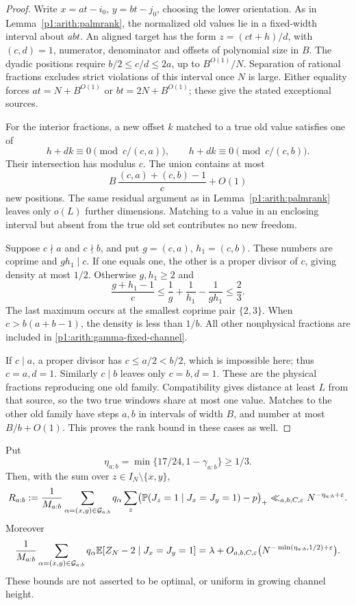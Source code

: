 \begin{proof}
Write \(x=at-i_0\), \(y=bt-j_0\), choosing the lower orientation.
As in Lemma~\ref{p1:arith:palmrank}, the normalized old values lie in
a fixed-width interval about \(abt\).  An aligned target has the form
\(z=(ct+h)/d\), with \((c,d)=1\), numerator, denominator and offsets
of polynomial size in \(B\).
The dyadic positions require
\(b/2\leq c/d\leq2a\), up to \(B^{O(1)}/N\).
Separation of rational fractions excludes strict violations of this
interval once \(N\) is large.
Either equality forces \(at=N+B^{O(1)}\) or \(bt=2N+B^{O(1)}\);
these give the stated exceptional sources.

For the interior fractions, a new offset \(k\) matched to a true old
value satisfies one of
\[
 h+dk\equiv0\pmod{c/(c,a)},\qquad
 h+dk\equiv0\pmod{c/(c,b)}.
\]
Their intersection has modulus \(c\).
The union contains at most
\[
 B\,\frac{(c,a)+(c,b)-1}{c}+O(1)
\]
new positions.  The same residual argument as in
Lemma~\ref{p1:arith:palmrank} leaves only \(o(L)\) further dimensions.
Matching to a value in an enclosing interval but absent from the true
old set contributes no new freedom.

Suppose \(c\nmid a\) and \(c\nmid b\), and put \(g=(c,a)\), \(h_1=(c,b)\).
These numbers are coprime and \(gh_1\mid c\).
If one equals one, the other is a proper divisor of \(c\), giving
density at most \(1/2\).
Otherwise \(g,h_1\geq2\) and
\[
 \frac{g+h_1-1}{c}
 \leq\frac1g+\frac1{h_1}-\frac1{gh_1}\leq\frac23.
\]
The last maximum occurs at the smallest coprime pair \(\{2,3\}\).
When \(c>b(a+b-1)\), the density is less than \(1/b\).
All other nonphysical fractions are included in
\eqref{p1:arith:gamma-fixed-channel}.

If \(c\mid a\), a proper divisor has \(c\leq a/2<b/2\), which is
impossible here; thus \(c=a,d=1\).
Similarly \(c\mid b\) leaves only \(c=b,d=1\).
These are the physical fractions reproducing one old family.
Compatibility gives distance at least \(L\) from that source, so the
two true windows share at most one value.
Matches to the other old family have steps \(a,b\) in intervals of
width \(B\), and number at most \(B/b+O(1)\).
This proves the rank bound in these cases as well.
\end{proof}

\begin{proposition}
\label{p1:arith:fixed-channel-palm}
Put
\[
 \eta_{a:b}=\min\{17/24,1-\gamma_{a:b}\}\geq1/3.
\]
Then, with the sum over \(z\in I_N\setminus\{x,y\}\),
\[
 R_{a:b}:=
 \frac1{M_{a:b}}\sum_{\alpha=(x,y)\in\mathcal G_{a:b}}q_\alpha
 \sum_z\bigl(\P(J_z=1\mid J_x=J_y=1)-p\bigr)_+
 \ll_{a,b,C,\varepsilon}N^{-\eta_{a:b}+\varepsilon}.
\]
Moreover
\[
 \frac1{M_{a:b}}\sum_{\alpha=(x,y)\in\mathcal G_{a:b}}q_\alpha
 \E[Z_N-2\mid J_x=J_y=1]
 =\lambda+
 O_{a,b,C,\varepsilon}
 \bigl(N^{-\min(\eta_{a:b},1/2)+\varepsilon}\bigr).
\]
These bounds are not asserted to be optimal, or uniform in growing
channel height.
\end{proposition}


